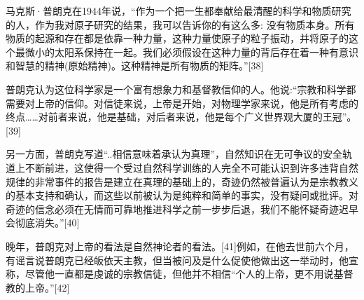 马克斯·普朗克在1944年说，“作为一个把一生都奉献给最清醒的科学和物质研究的人，作为我对原子研究的结果，我可以告诉你的有这么多: 没有物质本身。所有物质的起源和存在都是依靠一种力量，这种力量使原子的粒子振动，并将原子的这个最微小的太阳系保持在一起。我们必须假设在这种力量的背后存在着一种有意识和智慧的精神(原始精神)。这种精神是所有物质的矩阵。”[38]

普朗克认为这位科学家是一个富有想象力和基督教信仰的人。他说:“宗教和科学都需要对上帝的信仰。对信徒来说，上帝是开始，对物理学家来说，他是所有考虑的终点……对前者来说，他是基础，对后者来说，他是每个广义世界观大厦的王冠”。[39]

另一方面，普朗克写道“..相信意味着承认为真理”，自然知识在无可争议的安全轨道上不断前进，这使得一个受过自然科学训练的人完全不可能认识到许多违背自然规律的非常事件的报告是建立在真理的基础上的，奇迹仍然被普遍认为是宗教教义的基本支持和确认，而这些以前被认为是纯粹和简单的事实，没有疑问或批评。对奇迹的信念必须在无情而可靠地推进科学之前一步步后退，我们不能怀疑奇迹迟早会彻底消失。”[40]

晚年，普朗克对上帝的看法是自然神论者的看法。[41]例如，在他去世前六个月，有谣言说普朗克已经皈依天主教，但当被问及是什么促使他做出这一举动时，他宣称，尽管他一直都是虔诚的宗教信徒，但他并不相信“个人的上帝，更不用说基督教的上帝。”[42]

